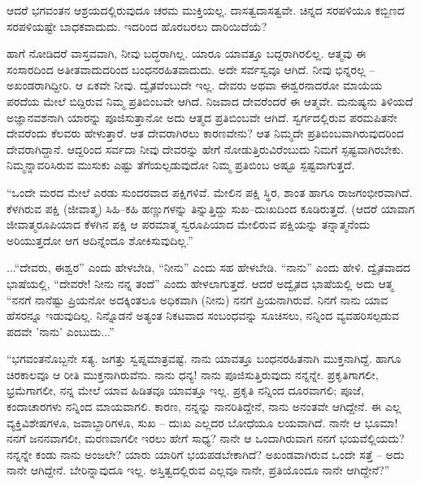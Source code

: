 \vskip 4pt

ಆದರೆ ಭಗವಂತನ ಆಶ್ರಯದಲ್ಲಿರುವುದೂ ಚರಮ ಮುಕ್ತಿಯಲ್ಲ. ದಾಸತ್ವ\break ದಾಸತ್ವವೇ. ಚಿನ್ನದ ಸರಪಳಿಯೂ ಕಬ್ಬಿಣದ ಸರಪಳಿಯಷ್ಟೇ ಬಾಧಕವಾದುದು. ಇದರಿಂದ ಹೊರಬರಲು ದಾರಿಯಿದೆಯೆ?

\vskip 4pt

ಹಾಗೆ ನೋಡಿದರೆ ವಾಸ್ತವವಾಗಿ, ನೀವು ಬದ್ಧರಾಗಿಲ್ಲ. ಯಾರೂ ಯಾವತ್ತೂ ಬದ್ದರಾಗಿರಲಿಲ್ಲ. ಆತ್ಮವು ಈ ಸಂಸಾರದಿಂದ ಅತೀತವಾದುದರಿಂದ ಬಂಧನರಹಿತವಾದುದು. ಅದೇ ಸರ್ವಸ್ವವೂ ಆಗಿದೆ. ನೀವು ಭಿನ್ನರಲ್ಲ – ಅಖಂಡರಾಗಿದ್ದೀರಿ. ಆ ಏಕವೇ ನೀವು. ದ್ವೈತವೆಂಬುದೇ ಇಲ್ಲ. ದೇವರು ಅಥವಾ ಈಶ್ವರನಾದರೋ ಮಾಯೆಯ ಪರದೆಯ ಮೇಲೆ ಬಿದ್ದಿರುವ ನಿಮ್ಮ ಪ್ರತಿಬಿಂಬವೇ ಆಗಿದೆ. ನಿಜವಾದ ದೇವರೆಂದರೆ ಈ ಆತ್ಮವೇ. ಮನುಷ್ಯನು ತಿಳಿಯದೆ ಅಜ್ಞಾನವಶನಾಗಿ ಯಾರನ್ನು ಪೂಜಿಸುತ್ತಾನೋ ಅದು ಆತ್ಮದ ಪ್ರತಿಬಿಂಬವೇ ಆಗಿದೆ. ಸ್ವರ್ಗದಲ್ಲಿರುವ ಪರಮಪಿತನೇ ದೇವರೆಂದು ಕೆಲವರು ಹೇಳುತ್ತಾರೆ. ಆತ ದೇವರಾಗಿರಲು ಕಾರಣವೇನು? ಆತ ನಿಮ್ಮದೇ ಪ್ರತಿಬಿಂಬವಾಗಿರುವುದರಿಂದ ದೇವರಾಗಿದ್ದಾನೆ. ಆದ್ದರಿಂದ ಸರ್ವದಾ ನೀವು ದೇವರನ್ನು ಹೇಗೆ ನೋಡುತ್ತಿರುವಿರೆಂಬುದು ನಿಮಗೆ ಸ್ಪಷ್ಟವಾಗಿರಬೇಕು. ನಿಮ್ಮನ್ನಾವರಿಸಿರುವ ಮುಸುಕು ಎಷ್ಟು ತೆಗೆಯಲ್ಪಡುವುದೋ ನಿಮ್ಮ ಪ್ರತಿಬಿಂಬ ಅಷ್ಟೂ ಸ್ಪಷ್ಟವಾಗುತ್ತದೆ.

\vskip 4pt

“ಒಂದೇ ಮರದ ಮೇಲೆ ಎರಡು ಸುಂದರವಾದ ಪಕ್ಷಿಗಳಿವೆ. ಮೇಲಿನ ಪಕ್ಷಿ ಸ್ಥಿರ, ಶಾಂತ ಹಾಗೂ ರಾಜಗಂಭೀರವಾಗಿದೆ. ಕೆಳಗಿರುವ ಪಕ್ಷಿ (ಜೀವಾತ್ಮ) ಸಿಹಿ–ಕಹಿ ಹಣ್ಣುಗಳನ್ನು ತಿನ್ನುತ್ತಿದ್ದು ಸುಖ–ದುಃಖದಿಂದ ಕೂಡಿರುತ್ತದೆ. (ಆದರೆ ಯಾವಾಗ ಜೀವಾತ್ಮರೂಪಿಯಾದ ಕೆಳಗಿನ ಪಕ್ಷಿ ಆ ಪರಮಾತ್ಮ ಸ್ವರೂಪಿಯಾದ ಮೇಲಿರುವ ಪಕ್ಷಿಯನ್ನು ತನ್ನಾತ್ಮನೆಂದು ಅರಿಯುತ್ತದೋ ಆಗ ಅದಿನ್ನೆಂದೂ ಶೋಕಿಸುವುದಿಲ್ಲ.”

\vskip 10pt

...“ದೇವರು, ಈಶ್ವರ” ಎಂದು ಹೇಳಬೇಡಿ, “ನೀನು'' ಎಂದು ಸಹ ಹೇಳಬೇಡಿ. “ನಾನು” ಎಂದು ಹೇಳಿ. ದ್ವೈತವಾದದ ಭಾಷೆಯಲ್ಲಿ, “ದೇವರೇ! ನೀನು ನನ್ನ ತಂದೆ” ಎಂದು ಹೇಳಲಾಗುತ್ತದೆ. ಆದರೆ ಅದ್ವೈತದ ಭಾಷೆಯಲ್ಲಿ ಅದು ಆತ್ಮ “ನನಗೆ ನಾನೆಷ್ಟು ಪ್ರಿಯನೋ ಅದಕ್ಕಿಂತಲೂ ಅಧಿಕವಾಗಿ (ನೀನು) ನನಗೆ ಪ್ರಿಯನಾಗಿರುವೆ. ನಿನಗೆ ನಾನು ಯಾವ ಹೆಸರನ್ನೂ ಇಡುವುದಿಲ್ಲ. ನಿನ್ನೊಡನೆ ಅತ್ಯಂತ ನಿಕಟವಾದ ಸಂಬಂಧವನ್ನು ಸೂಚಿಸಲು, ನನ್ನಿಂದ ವ್ಯವಹರಿಸಲ್ಪಡುವ ಪದವೇ 'ನಾನು' ಎಂಬುದು...”

\vskip 4pt

“ಭಗವಂತನೊಬ್ಬನೇ ಸತ್ಯ. ಜಗತ್ತು ಸ್ವಪ್ನಮಾತ್ರವಷ್ಟೆ. ನಾನು ಯಾವತ್ತೂ ಬಂಧನರಹಿತನಾಗಿ ಮುಕ್ತನಾಗಿದ್ದೆ. ಹಾಗೂ ಚಿರಕಾಲವೂ ಆ ರೀತಿ ಮುಕ್ತನಾಗಿರುವೆನು. ನಾನು ಧನ್ಯ! ನಾನು ಪೂಜಿಸುತ್ತಿರುವುದು ನನ್ನನ್ನೇ. ಪ್ರಕೃತಿಗಾಗಲೀ, ಭ್ರಮೆಗಾಗಲೀ, ನನ್ನ ಮೇಲೆ ಯಾವ ಹಿಡಿತವೂ ಯಾವತ್ತೂ ಇಲ್ಲ. ಪ್ರಕೃತಿ ನನ್ನಿಂದ ದೂರವಾಗಲಿ; ಪೂಜೆ, ಕಂದಾಚಾರಗಳು ನನ್ನಿಂದ ಮಾಯವಾಗಲಿ. ಕಾರಣ, ನನ್ನನ್ನು ನಾನರಿತಿದ್ದೇನೆ, ನಾನು ಅನಂತವೇ ಆಗಿದ್ದೇನೆ. ಈ ಎಲ್ಲ ವ್ಯಕ್ತಿವಿಶೇಷಗಳೂ, ಜವಾಬ್ದಾರಿಗಳೂ, ಸುಖ – ದುಃಖ ಎಲ್ಲದರ ಬೋಧೆಯೂ ಲಯವಾಗಿದೆ. ನಾನೇ ಆ ಭೂಮಾ! ನನಗೆ ಜನನವಾಗಲೀ, ಮರಣವಾಗಲೀ ಇರಲು ಹೇಗೆ ಸಾಧ್ಯ? ನಾನೇ ಆ ಒಂದಾಗಿರುವಾಗ ನನಗೆ ಭಯವೆಲ್ಲಿಯದು? ನನ್ನನ್ನೇ ಕಂಡು ನಾನು ಅಂಜಲೇ? ಯಾರು ಯಾರಿಗೆ ಭಯಪಡಬೇಕಾಗಿದೆ? ಅಖಂಡವಾಗಿರುವ ಒಂದೇ ಸತ್ತೆ – ಅದು ನಾನೇ ಆಗಿದ್ದೇನೆ. ಬೇರಿನ್ನಾವುದೂ ಇಲ್ಲ. ಅಸ್ತಿತ್ವದಲ್ಲಿರುವ ಎಲ್ಲವೂ ನಾನೇ, ಪ್ರತಿಯೊಂದೂ ನಾನೇ ಆಗಿದ್ದೇನೆ?”

